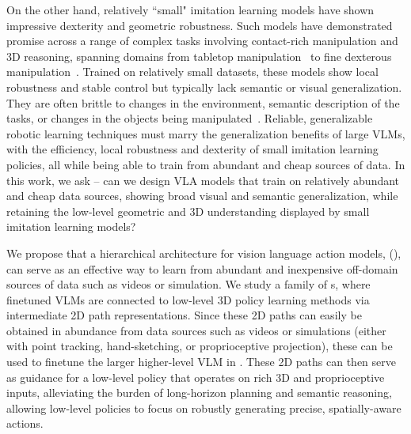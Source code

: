 On the other hand, relatively ``small"  imitation learning models have shown impressive dexterity and geometric robustness. Such models have demonstrated promise across a range of complex tasks involving contact-rich manipulation and 3D reasoning, spanning domains from tabletop manipulation~\citep{shridhar2023perceiver,goyal2023rvt} to fine dexterous manipulation~\citep{zhao23aloha}. Trained on relatively small datasets, these models show local robustness and stable control  but typically lack semantic or visual generalization. They are often brittle to changes in the environment, semantic description of the tasks, or changes in the objects being manipulated~\citep{pumacay2024colosseum}. Reliable, generalizable robotic learning techniques must marry the generalization benefits of large VLMs, with the efficiency, local robustness and dexterity of small imitation learning policies, all while being able to train from abundant and cheap sources of data. In this work, we ask -- can we design VLA models that train on relatively abundant and cheap data sources, showing broad visual and semantic generalization, while retaining the low-level geometric and 3D understanding displayed by small imitation learning models? 

We propose that a hierarchical architecture for vision language action models, \method (\methodlong), can serve as an effective way to learn from abundant and inexpensive off-domain sources of data such as videos or simulation. We study a family of \method s, where finetuned VLMs are connected to low-level 3D policy learning methods  via intermediate 2D path representations. Since these 2D paths can easily be obtained in abundance from data sources such as videos or simulations (either with point tracking, hand-sketching, or proprioceptive projection), these can be used to finetune the larger  higher-level VLM in \method. These 2D paths can then serve as guidance for a low-level policy that operates on rich 3D and proprioceptive inputs, alleviating the burden of long-horizon planning and semantic reasoning, allowing low-level policies to focus on robustly generating precise, spatially-aware actions. 

